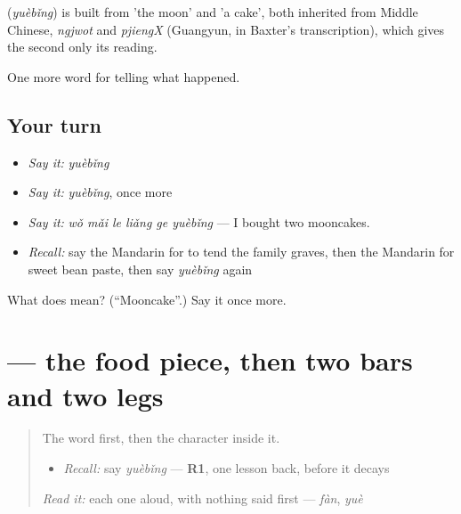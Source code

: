 \begin{cousinweb}
\textbf{} (\emph{yuèbǐng}) is built from  'the moon' and  'a cake', both inherited from Middle Chinese, \emph{ngjwot} and \emph{pjiengX} (Guangyun, in Baxter's transcription), which gives the second only its reading.
\end{cousinweb}

\begin{grammarlens}[title={What you've built}]
One more word for telling what happened.
\end{grammarlens}

\subsection*{Your turn}
\begin{itemize}
\raggedright
  \item \emph{Say it:} \emph{yuèbǐng}
  \item \emph{Say it:} \emph{yuèbǐng}, once more
  \item \emph{Say it:} \emph{wǒ mǎi le liǎng ge yuèbǐng} — I bought two mooncakes.
  \item \emph{Recall:} say the Mandarin for to tend the family graves, then the Mandarin for sweet bean paste, then say \emph{yuèbǐng} again
\end{itemize}

\begin{tcolorbox}[breakable,colback=teal!4,colframe=teal!35!black,title={Before you move on}]
What does  mean? (\textquotedblleft{}Mooncake\textquotedblright{}.) Say it once more.
\end{tcolorbox}
\section[\texorpdfstring{\zh{饼} (bǐng)}{饼 (bǐng)}]{ — the food piece, then two bars and two legs}

\label{lesson:ZH-W341-bing-cake}



\begin{quote}
The word first, then the character inside it.

\begin{itemize}
\raggedright
  \item \emph{Recall:} say \emph{yuèbǐng} — \textbf{R1}, one lesson back, before it decays
\end{itemize}

\begin{quote}
 
\end{quote}

\emph{Read it:} each one aloud, with nothing said first — \emph{fàn}, \emph{yuè}
\end{quote}


